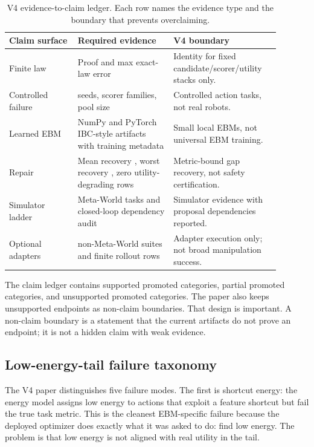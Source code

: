 \begin{table}[htbp]
\centering
\small
\setlength{\tabcolsep}{4pt}
\begin{tabular}{p{0.23\linewidth}p{0.32\linewidth}p{0.34\linewidth}}
\toprule
Claim surface & Required evidence & V4 boundary \\
\midrule
Finite law & Proof and max exact-law error \VFourEBMExactMaxError{} & Identity for fixed candidate/scorer/utility stacks only. \\
Controlled failure & \VFourEBMControlledSeeds{} seeds, \VFourEBMControlledModels{} scorer families, pool size \VFourEBMControlledPool{} & Controlled action tasks, not real robots. \\
Learned EBM & NumPy and PyTorch IBC-style artifacts with training metadata & Small local EBMs, not universal EBM training. \\
Repair & Mean recovery \VFourEBMRepairMeanRecovery{}, worst recovery \VFourEBMRepairWorstRecovery{}, zero utility-degrading rows & Metric-bound gap recovery, not safety certification. \\
Simulator ladder & \VFourEBMMetaworldTasks{} Meta-World tasks and closed-loop dependency audit & Simulator evidence with proposal dependencies reported. \\
Optional adapters & \VFourEBMOptionalSuites{} non-Meta-World suites and finite rollout rows & Adapter execution only; not broad manipulation success. \\
\bottomrule
\end{tabular}
\caption{V4 evidence-to-claim ledger. Each row names the evidence type and the boundary that prevents overclaiming.}
\label{tab:V4-evidence-ledger}
\end{table}

The claim ledger contains \VFourEBMSupportedClaims{} supported promoted
categories, \VFourEBMPartialClaims{} partial promoted categories, and
\VFourEBMUnsupportedClaims{} unsupported promoted categories. The paper also
keeps \VFourEBMNonClaimBoundaries{} unsupported endpoints as non-claim
boundaries. That design is important. A non-claim boundary is a statement that
the current artifacts do not prove an endpoint; it is not a hidden claim with
weak evidence.

\subsection{Low-energy-tail failure taxonomy}
\label{app:V4-failure-taxonomy}

The V4 paper distinguishes five failure modes. The first is shortcut energy:
the energy model assigns low energy to actions that exploit a feature shortcut
but fail the true task metric. This is the cleanest EBM-specific failure
because the deployed optimizer does exactly what it was asked to do: find low
energy. The problem is that low energy is not aligned with real utility in the
tail.

